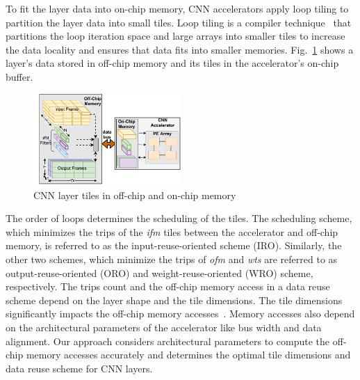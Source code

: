 \documentclass[a4paper,10pt]{article}
\begin{document}
To fit the layer data into on-chip memory, CNN accelerators apply loop tiling to partition the layer data into small tiles. Loop tiling is a compiler  technique~\cite{aho2006compilers} that partitions the loop iteration space and large arrays into smaller tiles to increase the data locality and ensures that data fits into smaller memories. 
Fig.~\ref{fig:partitioningDataUsingTiling} shows a layer's data stored in off-chip memory and its tiles in the accelerator's on-chip buffer.
\begin{figure}[!htb]
	\centering
	\includegraphics[width=0.5\textwidth]{images/AboutTheCNNTiles.pdf}
	\caption{CNN layer tiles in off-chip and on-chip memory}
	\label{fig:partitioningDataUsingTiling}
	\vspace{-1.0em}
\end{figure}
 The order of loops determines the scheduling of the tiles. The scheduling scheme, which minimizes the trips of the \textit{ifm} tiles between the accelerator and off-chip memory, is referred to as the input-reuse-oriented scheme (IRO). Similarly, the other two schemes, which minimize the trips of \textit{ofm} and \textit{wts} are referred to as output-reuse-oriented (ORO) and weight-reuse-oriented (WRO) scheme, respectively. The trips count and the off-chip memory access in a data reuse scheme depend on the layer shape and the tile dimensions. 
The tile dimensions significantly impacts the off-chip memory accesses~\cite{zhang2015optimizing, Li2018SmartShuttleOO}. Memory accesses also depend on the architectural parameters of the accelerator like bus width and data alignment. 
Our approach considers architectural parameters to compute the off-chip memory accesses accurately and determines the optimal tile dimensions and data reuse scheme for CNN layers.
\end{document}
